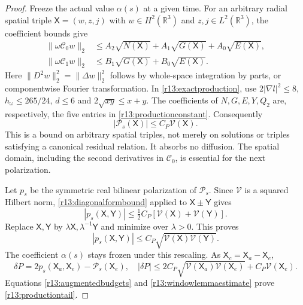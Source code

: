\documentclass[11pt]{article}
\numberwithin{equation}{section}
\newcommand{\R}{\mathbb R}
\begin{document}
\begin{proof}
Freeze the actual value $\alpha(s)$ at a given time. For an arbitrary
radial spatial triple $\mathsf X=(w,z,j)$ with $w\in H^2(\R^3)$ and
$z,j\in L^2(\R^3)$, the coefficient bounds give
\begin{align*}
 \|\omega\mathscr C_0w\|_2
   &\le A_2\sqrt{N(\mathsf X)}+A_1\sqrt{G(\mathsf X)}
                                      +A_0\sqrt{E(\mathsf X)},\\
 \|\omega\mathscr C_1w\|_2
   &\le B_1\sqrt{G(\mathsf X)}+B_0\sqrt{E(\mathsf X)}.
\end{align*}
Here $\|D^2w\|_2^2=\|\Delta w\|_2^2$ follows by whole-space
integration by parts, or componentwise Fourier transformation. In
\eqref{r13:exactproduction}, use
$2|\nabla l|^2\le8$, $h_\omega\le265/24$, $d\le6$ and
$2\sqrt{xy}\le x+y$. The coefficients of $N,G,E,Y,Q_2$ are,
respectively, the five entries in \eqref{r13:productionconstant}.
Consequently
\begin{equation}\label{r13:diagonalformbound}
 |\mathcal P_s(\mathsf X)|\le C_P\mathscr V(\mathsf X).
\end{equation}
This is a bound on arbitrary spatial triples, not merely on solutions
or triples satisfying a canonical residual relation. It absorbs no
diffusion. The spatial domain, including the second derivatives in
$\mathscr C_0$, is essential for the next polarization.

Let $p_s$ be the symmetric real bilinear polarization of
$\mathcal P_s$. Since $\mathscr V$ is a squared Hilbert norm,
\eqref{r13:diagonalformbound} applied to $\mathsf X\pm\mathsf Y$ gives
\[
 |p_s(\mathsf X,\mathsf Y)|
 \le\tfrac12C_P[\mathscr V(\mathsf X)+\mathscr V(\mathsf Y)].
\]
Replace $\mathsf X,\mathsf Y$ by
$\lambda\mathsf X,\lambda^{-1}\mathsf Y$ and minimize over
$\lambda>0$. This proves
\[
 |p_s(\mathsf X,\mathsf Y)|
       \le C_P\sqrt{\mathscr V(\mathsf X)\mathscr V(\mathsf Y)}.
\]
The coefficient $\alpha(s)$ stays frozen under this rescaling. As
$\mathsf X_c=\mathsf X_a-\mathsf X_e$,
\[
 \delta P=2p_s(\mathsf X_a,\mathsf X_e)-\mathcal P_s(\mathsf X_e),
 \quad
 |\delta P|\le2C_P\sqrt{\mathscr V(\mathsf X_a)\mathscr V(\mathsf X_e)}
                                  +C_P\mathscr V(\mathsf X_e).
\]
Equations \eqref{r13:augmentedbudgets} and
\eqref{r13:windowlemmaestimate} prove \eqref{r13:productiontail}.


\end{proof}
\end{document}

